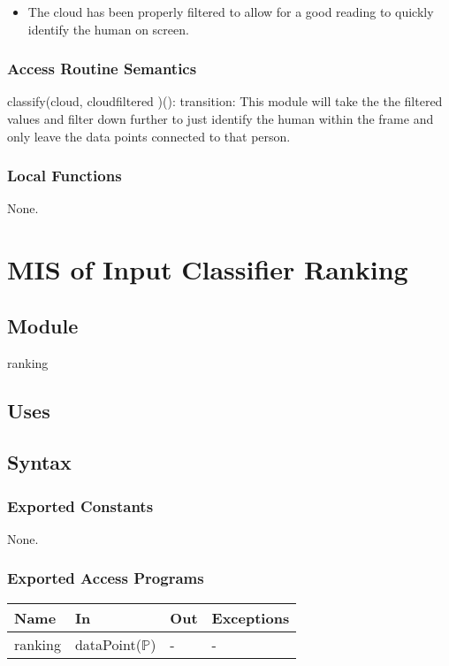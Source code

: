 \documentclass[12pt, titlepage]{article}
\begin{document}
\begin{itemize}
  \item The cloud has been properly filtered to allow for a good reading to quickly identify the human on screen.
\end{itemize}

\subsubsection{Access Routine Semantics}

\noindent classify(cloud, cloudfiltered )():
transition: This module will take the the filtered values and filter down further to just identify the human within the frame and only leave the data points connected to that person.
\subsubsection{Local Functions}

None.
\newpage

\section{MIS of Input Classifier Ranking} \label{ModuleICR} 

\subsection{Module}

ranking

\subsection{Uses}

\subsection{Syntax}

\subsubsection{Exported Constants}

None.

\subsubsection{Exported Access Programs}

\begin{center}
\begin{tabular}{p{2cm} p{4cm} p{4cm} p{2cm}}
\hline
\textbf{Name} & \textbf{In} & \textbf{Out} & \textbf{Exceptions} \\
\hline
ranking & dataPoint($\mathbb{P}$)  & - & - \\
\hline
\end{tabular}
\end{center}
\end{document}
